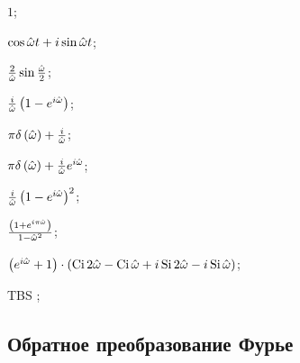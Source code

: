 \begin{enumsols}
		\item \( 1 \); \sfill %
		\item \( \cos{\hat{\omega}t} + i \sin{\hat{\omega}t} \); \sfill %
		\item \( \frac{2}{\hat{\omega}} \sin{\frac{\hat{\omega}}{2}} \); \sfill %
		\item \( \frac{i}{\hat{\omega}} \left( 1 - e^{i\hat{\omega}} \right) \); \sfill %
		\item \( \pi \delta\left( \hat{\omega} \right) + \frac{i}{\hat{\omega}} \); \sfill %
		\item \( \pi \delta\left( \hat{\omega} \right) + \frac{i}{\hat{\omega}} e^{i \hat{\omega}} \); \sfill %

		\item \( \frac{i}{\hat{\omega}} \left( 1 - e^{i \hat{\omega}} \right)^2 \); \sfill %
		\item \( \frac{\left( 1 + e^{i \pi \hat{\omega}} \right)}{1 - \hat{\omega}^2} \); \sfill %
		\item \( \left( e^{i\hat{\omega}} + 1 \right) \cdot \left(  \operatorname{Ci}{2\hat{\omega}} - \operatorname{Ci}{\hat{\omega}} + i \operatorname{Si}{2\hat{\omega}} - i \operatorname{Si}{\hat{\omega}}  \right) \); \sfill %
		\item TBS \( \); \sfill %

	\end{enumsols}

\subsection*{Обратное преобразование Фурье}

